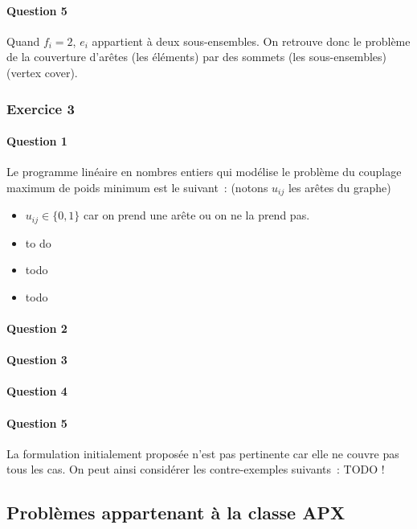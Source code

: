 \documentclass[a4paper, 12pt]{article}
\begin{document}
\paragraph{Question 5}

Quand $f_i = 2$, $e_i$ appartient à deux sous-ensembles. On retrouve
donc le problème de la couverture d'arêtes (les éléments) par des
sommets (les sous-ensembles) (vertex cover).

\subsubsection*{Exercice 3}

\paragraph{Question 1}Le programme linéaire en nombres entiers qui modélise le
  problème du couplage maximum de poids minimum est le suivant~:
  (notons $u_{ij}$ les arêtes du graphe)
\begin{itemize}
\item $u_{ij} \in \{0, 1\}$ car on prend une arête ou on ne la prend pas.
\item to do
\item todo
\item todo
\end{itemize}

\paragraph{Question 2}
\paragraph{Question 3}
\paragraph{Question 4}
\paragraph{Question 5}
La formulation initialement proposée n'est pas pertinente car elle ne couvre pas tous les cas. On peut ainsi considérer
les contre-exemples suivants~: TODO !

\subsection{Problèmes appartenant à la classe APX}
\end{document}
